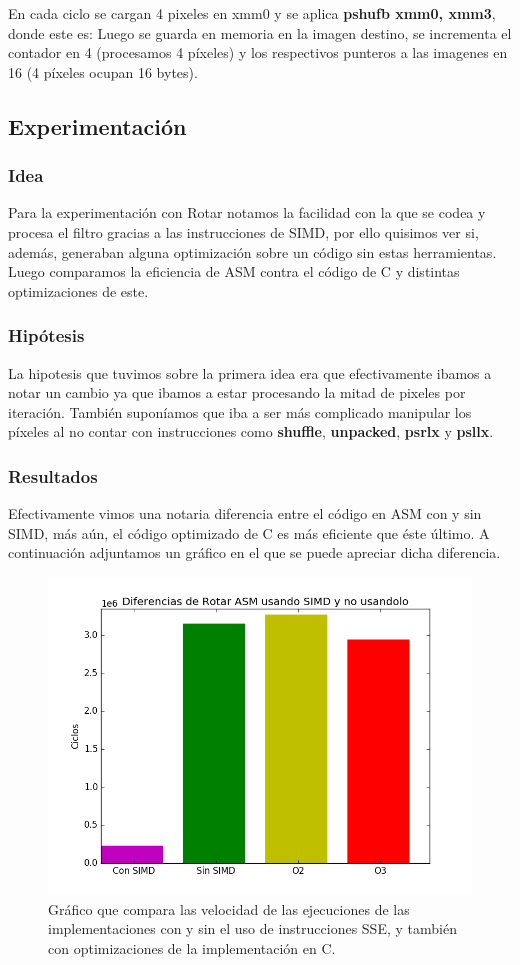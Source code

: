 En cada ciclo se cargan 4 pixeles en xmm0 y se aplica \textbf{pshufb xmm0, xmm3}, donde este es:
Luego se guarda en memoria en la imagen destino, se incrementa el contador en 4 (procesamos 4 píxeles) y los respectivos punteros a las imagenes en 16 (4 píxeles ocupan 16 bytes).	
	
	
\subsection{Experimentación}
\subsubsection{Idea}	


Para la experimentación con Rotar notamos la facilidad con la que se codea y procesa el filtro gracias a las instrucciones de SIMD, por ello quisimos ver si, además, generaban alguna optimización sobre un código sin estas herramientas.
Luego comparamos la eficiencia de ASM contra el código de C y distintas optimizaciones de este.
\subsubsection{Hipótesis}
La hipotesis que tuvimos sobre la primera idea era que efectivamente ibamos a notar un cambio ya que ibamos a estar procesando la mitad de pixeles por iteración. También suponíamos que iba a ser más complicado manipular los píxeles al no contar con instrucciones como \textbf{shuffle}, \textbf{unpacked}, \textbf{psrlx} y \textbf{psllx}.
	
\subsubsection{Resultados}
	Efectivamente vimos una notaria diferencia entre el código en ASM con y sin SIMD, más aún, el código optimizado de C es más eficiente que éste último.
	A continuación adjuntamos un gráfico en el que se puede apreciar dicha diferencia.
	
\begin{figure}[h!]
\centering
	\includegraphics[width = 15 cm, height = 8 cm]{imagenes/SinSIMD.png}
\caption[center]{Gráfico que compara las velocidad de las ejecuciones de las implementaciones con y sin el uso de instrucciones SSE, y también con optimizaciones de la implementación en C.}
\end{figure}

